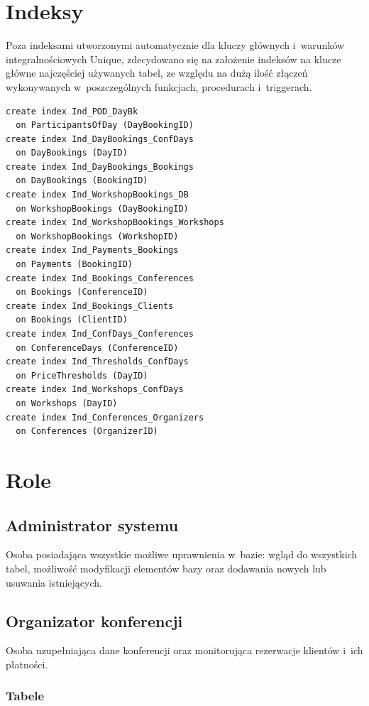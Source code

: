 \documentclass[12pt, a4paper]{mwrep}
\begin{document}
\chapter{Indeksy}

Poza indeksami utworzonymi automatycznie dla kluczy głównych i~warunków integralnościowych Unique, zdecydowano się na założenie indeksów na klucze główne najczęściej używanych tabel, ze względu na dużą ilość złączeń wykonywanych w~poszczególnych funkcjach, procedurach i~triggerach.

\begin{lstlisting}
create index Ind_POD_DayBk 
  on ParticipantsOfDay (DayBookingID)
create index Ind_DayBookings_ConfDays
  on DayBookings (DayID)
create index Ind_DayBookings_Bookings 
  on DayBookings (BookingID)
create index Ind_WorkshopBookings_DB 
  on WorkshopBookings (DayBookingID)
create index Ind_WorkshopBookings_Workshops 
  on WorkshopBookings (WorkshopID)
create index Ind_Payments_Bookings
  on Payments (BookingID)
create index Ind_Bookings_Conferences 
  on Bookings (ConferenceID)
create index Ind_Bookings_Clients 
  on Bookings (ClientID)
create index Ind_ConfDays_Conferences 
  on ConferenceDays (ConferenceID)
create index Ind_Thresholds_ConfDays 
  on PriceThresholds (DayID)
create index Ind_Workshops_ConfDays 
  on Workshops (DayID)
create index Ind_Conferences_Organizers 
  on Conferences (OrganizerID)
\end{lstlisting}

\chapter{Role}

\section{Administrator systemu}

Osoba posiadająca wszystkie możliwe uprawnienia w~bazie: wgląd do wszystkich tabel, możliwość modyfikacji elementów bazy oraz dodawania nowych lub usuwania istniejących.

\section{Organizator konferencji}

Osoba uzupełniająca dane konferencji oraz monitorująca rezerwacje klientów i~ich płatności.

\subsection{Tabele}
\end{document}
